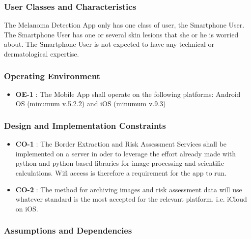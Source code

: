         \subsubsection{User Classes and Characteristics}

            The Melanoma Detection App only has one class of user, the Smartphone User. The Smartphone User has one or several skin lesions that she or he is worried about.
The Smartphone User is not expected to have any technical or dermatological expertise.

        \subsubsection{Operating Environment}

                    \noindent
                    \begin{itemize}[leftmargin=*]
                        \item[]  \textbf{OE-1} : The Mobile App shall operate on the following platforms: Android OS (minumum v.5.2.2) and iOS (minumum v.9.3)

                    \end{itemize}


        \subsubsection{Design and Implementation Constraints}

                    \noindent
                    \begin{itemize}[leftmargin=*]
                        \item[]  \textbf{CO-1} : The Border Extraction and Risk Assessment Services shall be implemented on a server in oder to leverage the effort already made with python and python based libraries for image processing and scientific calculations. Wifi access is therefore a requirement for the app to run.
                        \item[]  \textbf{CO-2} : The method for archiving images and risk assessment data will use whatever standard is the most accepted for the relevant platform. i.e. iCloud on iOS.


                    \end{itemize}

        \subsubsection{Assumptions and Dependencies}

